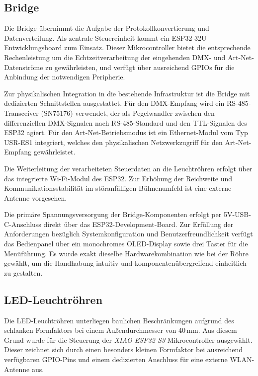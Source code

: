 \subsection{Bridge}
\label{subsec:bridge-hardware}

Die Bridge übernimmt die Aufgabe der Protokollkonvertierung und Datenverteilung. 
Als zentrale Steuereinheit kommt ein ESP32-32U Entwicklungsboard zum Einsatz. Dieser Mikrocontroller bietet 
die entsprechende Rechenleistung um die Echtzeitverarbeitung der eingehenden DMX- und Art-Net-Datenströme zu gewährleisten, 
und verfügt über ausreichend GPIOs für die Anbindung der notwendigen Peripherie.

Zur physikalischen Integration in die bestehende Infrastruktur ist die Bridge mit dedizierten Schnittstellen ausgestattet. 
Für den DMX-Empfang wird ein RS-485-Transceiver (SN75176) verwendet, der als Pegelwandler zwischen den 
differenziellen DMX-Signalen nach RS-485-Standard und den TTL-Signalen des ESP32 agiert. 
Für den Art-Net-Betriebsmodus ist ein Ethernet-Modul vom Typ USR-ES1 integriert, welches den physikalischen 
Netzwerkzugriff für den Art-Net-Empfang gewährleistet.

Die Weiterleitung der verarbeiteten Steuerdaten an die Leuchtröhren erfolgt über das integrierte 
Wi-Fi-Modul des ESP32. Zur Erhöhung der Reichweite und Kommunikationsstabilität im störanfälligen Bühnenumfeld ist 
eine externe Antenne vorgesehen.

Die primäre Spannungsversorgung der Bridge-Komponenten erfolgt per 5V-USB-C-Anschluss direkt über das ESP32-Development-Board. 
Zur Erfüllung der Anforderungen bezüglich Systemkonfiguration und Benutzerfreundlichkeit verfügt das Bedienpanel über 
ein monochromes OLED-Display sowie drei Taster für die Menüführung. 
Es wurde exakt dieselbe Hardwarekombination wie bei der Röhre gewählt, um die Handhabung 
intuitiv und komponentenübergreifend einheitlich zu gestalten.

\subsection{LED-Leuchtröhren}
\label{subsec:led-leuchtroehren-hardware}

Die LED-Leuchtröhren unterliegen baulichen Beschränkungen aufgrund des schlanken Formfaktors bei einem Außendurchmesser von 40\,mm. 
Aus diesem Grund wurde für die Steuerung der \textit{XIAO ESP32-S3} Mikrocontroller ausgewählt. 
Dieser zeichnet sich durch einen besonders kleinen Formfaktor bei ausreichend verfügbaren GPIO-Pins 
und einem dedizierten Anschluss für eine externe WLAN-Antenne aus.

